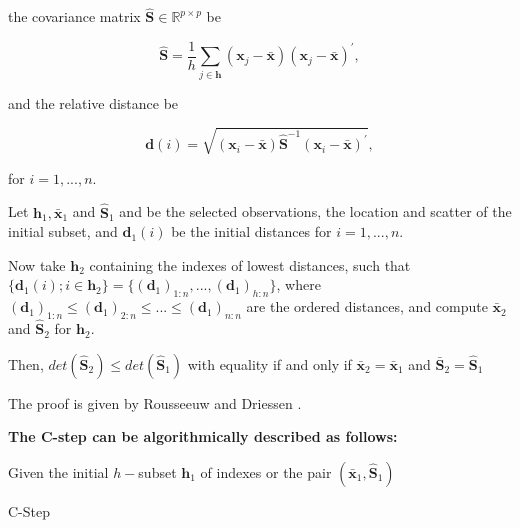\documentclass[review]{elsarticle}
\begin{document}
the covariance matrix $\boldsymbol{\hat{S}} \in \mathbb{R}^{p \times p}$ be

\begin{equation}\label{eq:eq03}
	\boldsymbol{\hat{S}} = \displaystyle\frac{1}{h}\displaystyle\sum_{j\in \boldsymbol{h}} (\boldsymbol{x}_j - \bar{\boldsymbol{x}})(\boldsymbol{x}_j - \bar{\boldsymbol{x}})^\prime,
\end{equation}

and the relative distance be 	

\begin{equation}\label{eq:eq04}
	\boldsymbol{d}(i) = \sqrt{(\boldsymbol{x}_i - \bar{\boldsymbol{x}}) \boldsymbol{\hat{S}}^{-1}(\boldsymbol{x}_i - \bar{\boldsymbol{x}})^\prime}, 
\end{equation}

for $i = 1,...,n$.

Let $\boldsymbol{h}_1, \bar{\boldsymbol{x}}_1$ and $\boldsymbol{\hat{S}}_1$ and be the selected observations, the location and scatter of the initial subset, and $\boldsymbol{d}_1(i)$ be the initial distances for $i = 1,...,n$. 

Now take $\boldsymbol{h}_2$ containing the indexes of lowest distances, such that $\{\boldsymbol{d}_1(i); i \in \boldsymbol{h}_2\} = \{(\boldsymbol{d}_1)_{1:n},...,(\boldsymbol{d}_1)_{h:n}\}$, where $(\boldsymbol{d}_1)_{1:n} \leq (\boldsymbol{d}_1)_{2:n} \leq ... \leq (\boldsymbol{d}_1)_{n:n}$ are the ordered distances, and compute $\boldsymbol{\bar{x}}_2$ and $\boldsymbol{\hat{S}}_2$ for $\boldsymbol{h}_2$.
	
Then, $det(\boldsymbol{\hat{S}}_2) \leq det(\boldsymbol{\hat{S}}_1)$ with equality if and only if $\boldsymbol{\bar{x}}_2 = \boldsymbol{\bar{x}}_1$ and $\boldsymbol{\bar{S}}_2 = \boldsymbol{\hat{S}}_1$

The proof is given by Rousseeuw and Driessen \cite{rousseeuw1999fastmcd}.
	
\textbf{The C-step can be algorithmically described as follows:}
\begin{algorithm}
	\label{alg:alg01}
	\scriptsize
	\SetAlgoLined
	Given the initial $h-$subset $\boldsymbol{h}_1$ of indexes or the pair $(\boldsymbol{\bar{x}}_1, \boldsymbol{\hat{S}}_1)$\;
	\caption{C-Step}
\end{algorithm}
\end{document}
